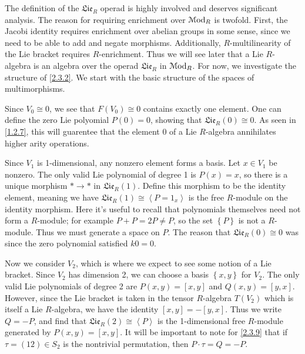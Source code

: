 \begin{discussion}\label{2.3.3}
	The definition of the $\mathfrak{Lie}_R$ operad is highly involved and deserves significant analysis. The reason for requiring enrichment over $\mathcal{M}\mathrm{od} _R$ is twofold. First, the Jacobi identity requires enrichment over abelian groups in some sense, since we need to be able to add and negate morphisms. Additionally, $R$-multilinearity of the Lie bracket requires $R$-enrichment. Thus we will see later that a Lie $R$-algebra is an algebra over the operad $\mathfrak{Lie} _R$ in $\mathcal{M}\mathrm{od} _R$. For now, we investigate the structure of \cref{2.3.2}. We start with the basic structure of the spaces of multimorphisms.

	Since $V_0 \cong 0$, we see that $F(V_0) \cong 0$ contains exactly one element. One can define the zero Lie polyomial $P(0)=0$, showing that $\mathfrak{Lie} _R(0)\cong 0$. As seen in \cref{1.2.7}, this will guarentee that the element 0 of a Lie $R$-algebra annihilates higher arity operations.

	Since $V_1$ is 1-dimensional, any nonzero element forms a basis. Let $x\in V_1$ be nonzero. The only valid Lie polynomial of degree 1 is $P(x) = x$, so there is a unique morphism $*\to *$ in $\mathfrak{Lie} _R(1)$. Define this morphism to be the identity element, meaning we have $\mathfrak{Lie} _R(1)\cong \left\langle P=1_x \right\rangle $ is the free $R$-module on the identity morphism. Here it's useful to recall that polynomials themselves need not form a $R$-module; for example $P+P=2P \neq P$, so the set $\left\{ P \right\} $ is not a $R$-module. Thus we must generate a space on $P$. The reason that $\mathfrak{Lie} _R(0)\cong 0$ was since the zero polynomial satisfied $k0=0$.

	Now we consider $V_2$, which is where we expect to see some notion of a Lie bracket. Since $V_2$ has dimension 2, we can choose a basis $\left\{ x,y \right\} $ for $V_2$. The only valid Lie polynomials of degree 2 are $P(x,y) = [x,y]$ and $Q(x,y) = [y,x]$. However, since the Lie bracket is taken in the tensor $R$-algebra $T(V_2)$ which is itself a Lie $R$-algebra, we have the identity $[x,y]=-[y,x]$. Thus we write $Q=-P$, and find that $\mathfrak{Lie} _R(2) \cong \left\langle P \right\rangle $ is the 1-dimensional free $R$-module generated by $P(x,y) = [x,y]$. It will be important to note for \cref{2.3.9} that if $\tau =(12)\in S_2$ is the nontrivial permutation, then $P\cdot \tau =Q=-P$.


\end{discussion}
